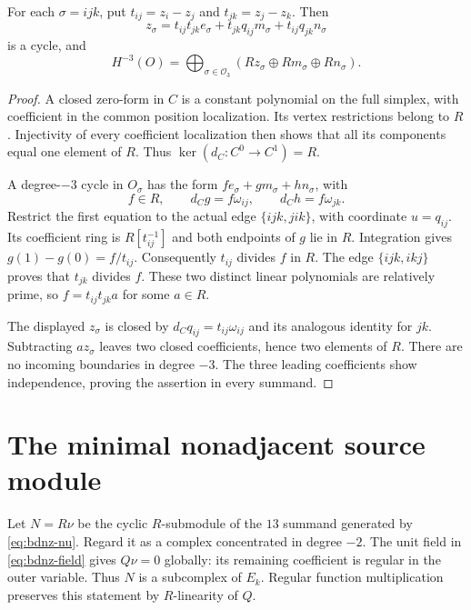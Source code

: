\begin{lemma}\label{lem:bdnz-lowest}
For each $\sigma=ijk$, put $t_{ij}=z_i-z_j$ and $t_{jk}=z_j-z_k$.
Then
\begin{equation}\label{eq:bdnz-zsigma}
 z_\sigma=t_{ij}t_{jk}e_\sigma
           +t_{jk}q_{ij}m_\sigma+t_{ij}q_{jk}n_\sigma
\end{equation}
is a cycle, and
\[
 H^{-3}(O)=\bigoplus_{\sigma\in\mathcal O_3}
 \left(Rz_\sigma\oplus Rm_\sigma\oplus Rn_\sigma\right).
\]
\end{lemma}
\begin{proof}
A closed zero-form in $C$ is a constant polynomial on the full simplex, with coefficient in the common position localization.
Its vertex restrictions belong to $R$.
Injectivity of every coefficient localization then shows that all its components equal one element of $R$.
Thus $\ker(d_C:C^0\to C^1)=R$.

A degree-$-3$ cycle in $O_\sigma$ has the form $fe_\sigma+gm_\sigma+hn_\sigma$, with
\[
 f\in R,\qquad d_Cg=f\omega_{ij},\qquad d_Ch=f\omega_{jk}.
\]
Restrict the first equation to the actual edge $\{ijk,jik\}$, with coordinate $u=q_{ij}$.
Its coefficient ring is $R[t_{ij}^{-1}]$ and both endpoints of $g$ lie in $R$.
Integration gives $g(1)-g(0)=f/t_{ij}$.
Consequently $t_{ij}$ divides $f$ in $R$.
The edge $\{ijk,ikj\}$ proves that $t_{jk}$ divides $f$.
These two distinct linear polynomials are relatively prime, so $f=t_{ij}t_{jk}a$ for some $a\in R$.

The displayed $z_\sigma$ is closed by $d_Cq_{ij}=t_{ij}\omega_{ij}$ and its analogous identity for $jk$.
Subtracting $a z_\sigma$ leaves two closed coefficients, hence two elements of $R$.
There are no incoming boundaries in degree $-3$.
The three leading coefficients show independence, proving the assertion in every summand.
\end{proof}

\section{The minimal nonadjacent source module}

Let $N=R\nu$ be the cyclic $R$-submodule of the $13$ summand generated by \eqref{eq:bdnz-nu}.
Regard it as a complex concentrated in degree $-2$.
The unit field in \eqref{eq:bdnz-field} gives $Q\nu=0$ globally: its remaining coefficient is regular in the outer variable.
Thus $N$ is a subcomplex of $E_k$.
Regular function multiplication preserves this statement by $R$-linearity of $Q$.


